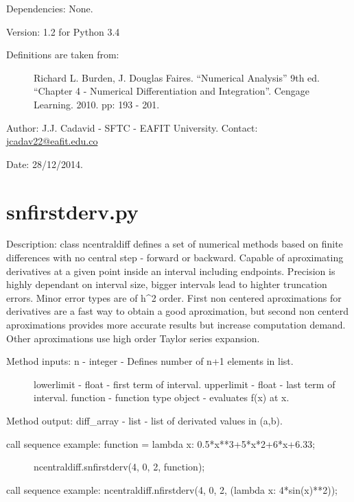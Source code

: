 \documentclass[letterpaper,10pt,oneside]{sphinxmanual}
\theoremstyle{plain}%
\theoremstyle{definition}%
\theoremstyle{remark}%
\begin{document}
Dependencies: None.

Version: 1.2 for Python 3.4
\begin{description}
\item[{Definitions are taken from:}] \leavevmode
Richard L. Burden, J. Douglas Faires. ``Numerical Analysis'' 9th ed.
``Chapter 4 - Numerical Differentiation and Integration''. 
Cengage Learning. 2010. pp: 193 - 201.

\end{description}

Author: J.J. Cadavid - SFTC - EAFIT University.
Contact: \href{mailto:jcadav22@eafit.edu.co}{jcadav22@eafit.edu.co}

Date: 28/12/2014.


\section{snfirstderv.py}
\label{code:snfirstderv-py}\label{code:module-snfirstderv}
Description: class ncentraldiff defines a set of numerical methods based on
finite differences with no central step - forward or backward. Capable of
aproximating derivatives at a given point inside an interval including 
endpoints. Precision is highly dependant on interval size, bigger intervals
lead to highter truncation errors. Minor error types are of h\textasciicircum{}2 order. First
non centered aproximations for derivatives are a fast way to obtain a good
aproximation, but second non centerd aproximations provides more accurate
results but increase computation demand. Other aproximations use high order
Taylor series expansion.
\begin{description}
\item[{Method inputs: n - integer - Defines number of n+1 elements in list.}] \leavevmode
lowerlimit - float - first term of interval.
upperlimit - float - last term of interval.
function - function type object - evaluates f(x) at x.

\end{description}

Method output: diff\_array - list - list of derivated values in (a,b).
\begin{description}
\item[{call sequence example: function = lambda x: 0.5*x**3+5*x*2+6*x+6.33;}] \leavevmode
ncentraldiff.snfirstderv(4, 0, 2, function);

\end{description}

call sequence example: ncentraldiff.nfirstderv(4, 0, 2, (lambda x: 4*sin(x)**2));
\end{document}
